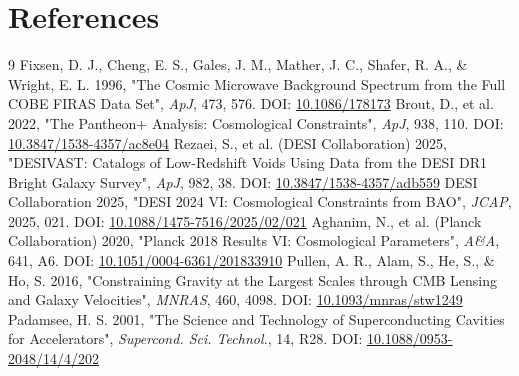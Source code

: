 \documentclass[11pt,a4paper]{article}
\begin{document}
\section{References}
\begin{thebibliography}{9}
 Fixsen, D. J., Cheng, E. S., Gales, J. M., Mather, J. C., Shafer, R. A., \& Wright, E. L. 1996, "The Cosmic Microwave Background Spectrum from the Full COBE FIRAS Data Set", \emph{ApJ}, 473, 576. DOI: \href{https://doi.org/10.1086/178173}{10.1086/\allowbreak{}178173}
 Brout, D., et al. 2022, "The Pantheon+ Analysis: Cosmological Constraints", \emph{ApJ}, 938, 110. DOI: \href{https://doi.org/10.3847/1538-4357/ac8e04}{10.3847/\allowbreak{}1538-4357/\allowbreak{}ac8e04}
 Rezaei, S., et al. (DESI Collaboration) 2025, "DESIVAST: Catalogs of Low-Redshift Voids Using Data from the DESI DR1 Bright Galaxy Survey", \emph{ApJ}, 982, 38. DOI: \href{https://doi.org/10.3847/1538-4357/adb559}{10.3847/\allowbreak{}1538-4357/\allowbreak{}adb559}
 DESI Collaboration 2025, "DESI 2024 VI: Cosmological Constraints from BAO", \emph{JCAP}, 2025, 021. DOI: \href{https://doi.org/10.1088/1475-7516/2025/02/021}{10.1088/\allowbreak{}1475-7516/\allowbreak{}2025/\allowbreak{}02/\allowbreak{}021}
 Aghanim, N., et al. (Planck Collaboration) 2020, "Planck 2018 Results VI: Cosmological Parameters", \emph{A\&A}, 641, A6. DOI: \href{https://doi.org/10.1051/0004-6361/201833910}{10.1051/\allowbreak{}0004-6361/\allowbreak{}201833910}
 Pullen, A. R., Alam, S., He, S., \& Ho, S. 2016, "Constraining Gravity at the Largest Scales through CMB Lensing and Galaxy Velocities", \emph{MNRAS}, 460, 4098. DOI: \href{https://doi.org/10.1093/mnras/stw1249}{10.1093/\allowbreak{}mnras/\allowbreak{}stw1249}
 Padamsee, H. S. 2001, "The Science and Technology of Superconducting Cavities for Accelerators", \emph{Supercond. Sci. Technol.}, 14, R28. DOI: \href{https://doi.org/10.1088/0953-2048/14/4/202}{10.1088/\allowbreak{}0953-2048/\allowbreak{}14/\allowbreak{}4/\allowbreak{}202}
\end{thebibliography}
\end{document}
